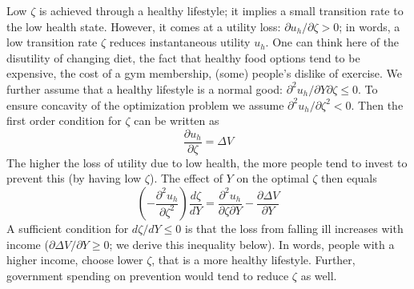 \documentclass[a4paper,12pt]{article}
\begin{document}
Low \(\zeta\) is achieved through a healthy lifestyle; it implies a small transition rate to the low health state. However, it comes at a utility loss: \(\partial u_h/ \partial \zeta > 0\); in words, a low transition rate \(\zeta\) reduces instantaneous utility \(u_h\). One can think here of the disutility of changing diet, the fact that healthy food options tend to be expensive, the cost of a gym membership, (some) people's dislike of exercise. We further assume that a healthy lifestyle is a normal good: \(\partial^2 u_h/ \partial Y \partial \zeta  \leq 0\). To ensure concavity of the optimization problem we assume \(\partial^2 u_h / \partial \zeta^2 <0\). Then the first order condition for \(\zeta\) can be written as
\begin{equation}
\label{eq:5}
\frac{\partial u_h}{\partial \zeta} = \Delta V
\end{equation}
The higher the loss of utility due to low health, the more people tend to invest to prevent this (by having low \(\zeta\)). The effect of \(Y\) on the optimal \(\zeta\) then equals
\begin{equation}
\label{eq:6}
\left(- \frac{\partial^2 u_h}{\partial \zeta^2}\right) \frac{d\zeta}{dY} = \frac{\partial^2 u_h}{\partial \zeta \partial Y} - \frac{\partial \Delta V}{\partial Y} 
\end{equation}
A sufficient condition for \(d\zeta/dY \leq 0\) is that the loss from falling ill increases with income (\(\partial \Delta V/\partial Y \geq 0\); we derive this inequality below). In words, people with a higher income, choose lower \(\zeta\), that is a more healthy lifestyle. Further, government spending on prevention would tend to reduce \(\zeta\) as well.
\end{document}
